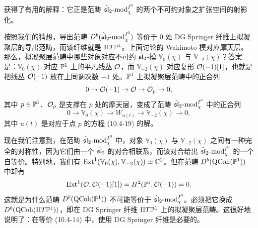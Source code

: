 
获得了有用的解释：它正是范畴 $\hat{\mathfrak{sl}}_2\text{-mod}^{I^0}_\chi$ 的两个不可约对象之扩张空间的射影化。

按照我们的猜想，导出范畴 $D^b(\hat{\mathfrak{sl}}_2\text{-mod}^{I^0}_\chi)$ 等价于 $0$ 处 DG Springer 纤维上拟凝聚层的导出范畴，而该纤维就是 $\Pi T\mathbb{P}^1$。上面讨论的 Wakimoto 模对应摩天层。那么，拟凝聚层范畴中哪些对象对应不可约 $\hat{\mathfrak{sl}}_2$-模 $\mathbb{V}_0(\chi)$ 与 $\mathbb{V}_{-2}(\chi)$？答案是：$\mathbb{V}_0(\chi)$ 对应 $\mathbb{P}^1$ 上的平凡线丛 $\mathcal{O}$，而 $\mathbb{V}_{-2}(\chi)$ 对应复形 $\mathcal{O}(-1)[1]$，也就是把线丛 $\mathcal{O}(-1)$ 放在上同调次数 $-1$ 处。$\mathbb{P}^1$ 上拟凝聚层范畴中的正合列
\[
    0\to \mathcal{O}(-1)\to \mathcal{O}\to \mathcal{O}_p\to 0,
\]
其中 $p\in\mathbb{P}^1$、$\mathcal{O}_p$ 是支撑在 $p$ 处的摩天层，变成了范畴 $\hat{\mathfrak{sl}}_2\text{-mod}^{I^0}_\chi$ 中的正合列
\[
    0\to \mathbb{V}_0(\chi)\to W_{u(t)}\to \mathbb{V}_{-2}(\chi)\to 0,
\]
其中 $u(t)$ 是对应于点 $p$ 的方程 (10.4-19) 的解。

现在我们注意到，在范畴 $\hat{\mathfrak{sl}}_2\text{-mod}^{I^0}_\chi$ 中，对象 $\mathbb{V}_0(\chi)$ 与 $\mathbb{V}_{-2}(\chi)$ 之间有一种完全的对称性，因为它们由一个 $\hat{\mathfrak{sl}}_2$ 的对合相联系，而该对合给出 $\hat{\mathfrak{sl}}_2\text{-mod}^{I^0}_\chi$ 的一个自等价。特别地，我们有 $\operatorname{Ext}^1(\mathbb{V}_0(\chi),\mathbb{V}_{-2}(\chi))\simeq\mathbb{C}^2$。但在范畴 $D^b(\operatorname{QCoh}(\mathbb{P}^1))$ 中却有
\[
    \operatorname{Ext}^1(\mathcal{O},\mathcal{O}(-1)[1]) = H^2(\mathbb{P}^1,\mathcal{O}(-1)) = 0 .
\]
这就是为什么范畴 $D^b(\operatorname{QCoh}(\mathbb{P}^1))$ 不可能等价于 $\hat{\mathfrak{sl}}_2\text{-mod}^{I^0}_\chi$。必须把它换成 $D^b(\operatorname{QCoh}(\Pi T\mathbb{P}^1))$，即在 DG Springer 纤维 $\Pi T\mathbb{P}^1$ 上的拟凝聚层范畴。这很好地说明了：在等价 (10.4-14) 中，使用 DG Springer 纤维是必要的。

